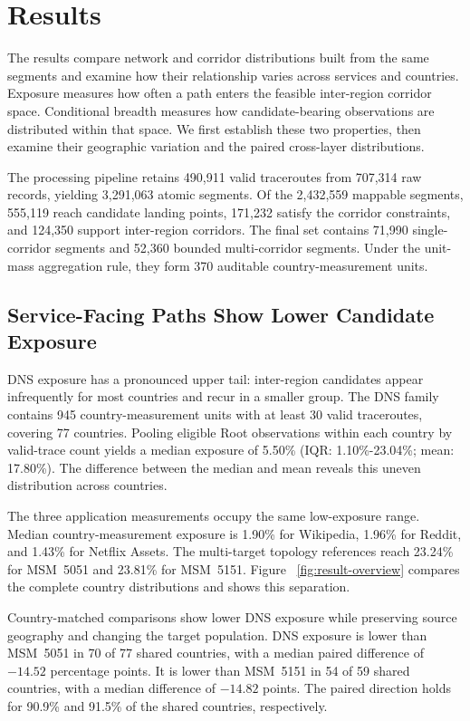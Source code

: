 \section{Results}
\label{sec:result}

The results compare network and corridor distributions built from the same
segments and examine how their relationship varies across services and
countries. Exposure measures how often a path enters the feasible inter-region
corridor space. Conditional breadth measures how candidate-bearing
observations are distributed within that space. We first establish these two
properties, then examine their geographic variation and the paired cross-layer
distributions.

The processing pipeline retains 490,911 valid traceroutes from 707,314 raw
records, yielding 3,291,063 atomic segments. Of the 2,432,559 mappable
segments, 555,119 reach candidate landing points, 171,232 satisfy the corridor
constraints, and 124,350 support inter-region corridors. The final set contains
71,990 single-corridor segments and 52,360 bounded multi-corridor segments.
Under the unit-mass aggregation rule, they form 370 auditable
country-measurement units.

\subsection{Service-Facing Paths Show Lower Candidate Exposure}
\label{subsec:overall-exposure}

DNS exposure has a pronounced upper tail: inter-region candidates appear
infrequently for most countries and recur in a smaller group. The DNS family
contains 945 country-measurement units with at least 30 valid traceroutes,
covering 77 countries. Pooling eligible Root observations within each country
by valid-trace count yields a median exposure of 5.50\% (IQR:
1.10\%-23.04\%; mean: 17.80\%). The difference between the median and mean
reveals this uneven distribution across countries.

The three application measurements occupy the same low-exposure range.
Median country-measurement exposure is 1.90\% for Wikipedia, 1.96\% for
Reddit, and 1.43\% for Netflix Assets. The multi-target topology references
reach 23.24\% for MSM~5051 and 23.81\% for MSM~5151. Figure
~\ref{fig:result-overview} compares the complete country distributions and
shows this separation.

Country-matched comparisons show lower DNS exposure while preserving source
geography and changing the target population. DNS exposure is lower than
MSM~5051 in 70 of 77 shared countries, with a median paired difference of
\(-14.52\) percentage points. It is lower than MSM~5151 in 54 of 59 shared
countries, with a median difference of \(-14.82\) points. The paired direction
holds for 90.9\% and 91.5\% of the shared countries, respectively.

